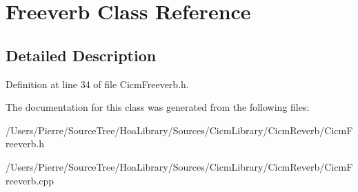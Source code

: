 \hypertarget{class_freeverb}{\section{Freeverb Class Reference}
\label{class_freeverb}
}


\subsection{Detailed Description}


Definition at line 34 of file Cicm\-Freeverb.\-h.



The documentation for this class was generated from the following files\-:\begin{DoxyCompactItemize}
\item 
/\-Users/\-Pierre/\-Source\-Tree/\-Hoa\-Library/\-Sources/\-Cicm\-Library/\-Cicm\-Reverb/Cicm\-Freeverb.\-h\item 
/\-Users/\-Pierre/\-Source\-Tree/\-Hoa\-Library/\-Sources/\-Cicm\-Library/\-Cicm\-Reverb/Cicm\-Freeverb.\-cpp\end{DoxyCompactItemize}
